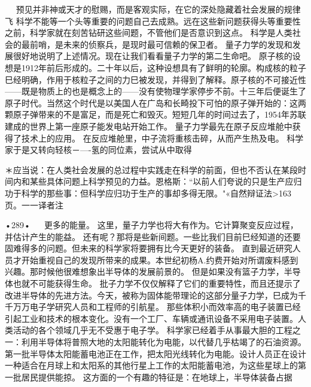   
预见并非神或天才的慰赐，而是客观实际，在它的深处隐藏着社会发展的规律飞
科学不能等一个头等重要的问题自己去成熟。远在这些新问题获得头等重要性之前，科学家就在刻苦钻研这些间题，不管他们是否意识到这点。
科学是人类社会的最前哨，是未来的侦察兵，是现时最可信赖的保卫者。
量子力学的发现和发展很好地说明了上述情况。现在让我们看看量子力学的第二生命吧。
原子核的设想是1912年前后形成的。二十年以后，这种设想具有了鲜明的轮廓。构成核的粒子巳经明确，作用于核粒子之间的力巳被发现，并得到了解释。原子核的不可接近性——既是物质上的也是概念上的——没有使物理学家停步不前。十三年后便诞生了原子时代。当然这个时代是以美国人在广岛和长畸投下可怕的原子弹开始的：这两颗原子弹带来的不是富足，而是死亡和毁灭。短短几年的时间过去了，1954年苏联建成的世界上第一座原子能发电站开始工作。
量子力学最先在原子反应堆舱中获得了技术上的应用。
在反应堆舱里，中子流将重核击碎，从而产生热及电。
科学家于是又转向轻核－—-氢的同位素，尝试从中取得

＊应当说：在人类社会发展的总过程中实践走在科学的前面，但也不否认在某段时间内和某些具体问题上科学预见的力益。恩格斯：“以前人们夸说的只是生产应归功于科学的那些事：但科学应归功于生产的事却多得无限。"«自然辩证法>163页。一一译者注

•289•
  
更多的能量。
这里，量子力学也将大有作为。它计算聚变反应过程，并估计产生的能益。
还有呢？那将是些新间题。一些比我们目前巳经知道的还要固难得多的问题。但未来的科学家将要拥有比今天更好的装备。
直到最近研究人员才开始重视自己的发现所带来的成果。本世纪初杨A.约费开始对所谓废料感到兴趣。那时候他很难想象出半导体的发展前景的。
但是如果没有篮子力学，半导体也就不可能获得生命。
批子力学不仅仅解释了它们的重要特性，而且还提示了改进半导体的先进方法。今天，被称为固体能带理论的这部分量子力学，巳成为千千万万电子学研究人员和工程师的引航星。
那些体积小而效率高的电子装置已经引起工业和技术的根本变化。没有一个工厂、车辆或通讯设备不采用电子装置。人类活动的各个领域几乎无不受惠于电子学。
科学家已经着手从事最大胆的工程之一：利用半导体将普照大地的太阳能转化为电能，以代替几乎枯竭了的石油资源。第一批半导体太阳能蓄电池正在工作，把太阳光线转化为电能。设计人员正在设计一种适合在月球上和太阳系的其他行星上工作的太阳能蓄电池，为这些星球上的第一批居民提供能掠。
这方面的一个有趣的特征是：在地球上，半导体装备占据

